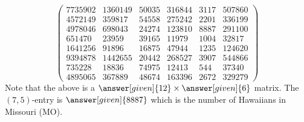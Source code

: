 \documentclass{ximera}
\begin{document}
\begin{example}
\begin{explanation}
\[\begin{pmatrix}
  7735902 & 1360149 & 50035 & 316844 & 3117 & 507860\\
  4572149 & 359817 & 54558 & 275242 & 2201 & 336199\\
  4978046 & 698043 & 24274 & 123810 & 8887 & 291100\\
  651470 & 23959 & 39165 & 11979 & 1004 & 32817\\
  1641256 & 91896 & 16875 & 47944 & 1235 & 124620\\
  9394878 & 1442655 & 20442 & 268527 & 3907 & 544866\\
  735228 & 18836 & 74975 & 12413 & 544 & 37340\\
  4895065 & 367889 & 48674 & 163396 & 2672 & 329279
  \end{pmatrix}
  \]
  Note that the above is a $\answer[given]{12}\times \answer[given]{6}$ matrix. The $(7, 5)$-entry is
  $\answer[given]{8887}$ which is the number of Hawaiians in Missouri (MO).
  \end{explanation}
\end{example}
\end{document}
